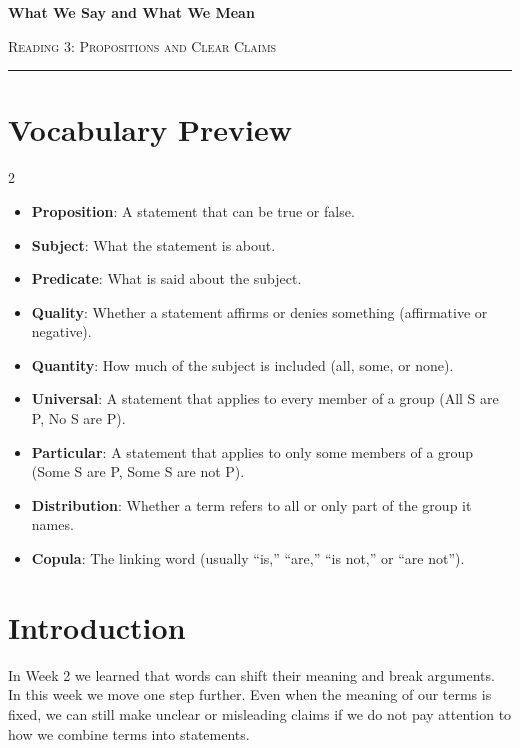 \documentclass[12pt]{article}
\begin{document}
\begin{center}
{\LARGE\bfseries What We Say and What We Mean}\par\vspace{0.15em}
{\large\scshape Reading 3: Propositions and Clear Claims}\par\vspace{0.45em}
\rule{0.82\textwidth}{0.4pt}\par\vspace{0.6em}
\end{center}

\section*{Vocabulary Preview}
\begin{multicols}{2}
\begin{itemize}[leftmargin=*, itemsep=0.15em]
\item \textbf{Proposition}: A statement that can be true or false.
\item \textbf{Subject}: What the statement is about.
\item \textbf{Predicate}: What is said about the subject.
\item \textbf{Quality}: Whether a statement affirms or denies something (affirmative or negative).
\item \textbf{Quantity}: How much of the subject is included (all, some, or none).
\item \textbf{Universal}: A statement that applies to every member of a group (All S are P, No S are P).
\item \textbf{Particular}: A statement that applies to only some members of a group (Some S are P, Some S are not P).
\item \textbf{Distribution}: Whether a term refers to all or only part of the group it names.
\item \textbf{Copula}: The linking word (usually “is,” “are,” “is not,” or “are not”).
\end{itemize}
\end{multicols}

\section*{Introduction}
In Week 2 we learned that words can shift their meaning and break arguments. In this week we move one step further. Even when the meaning of our terms is fixed, we can still make unclear or misleading claims if we do not pay attention to how we combine terms into statements.
\end{document}
